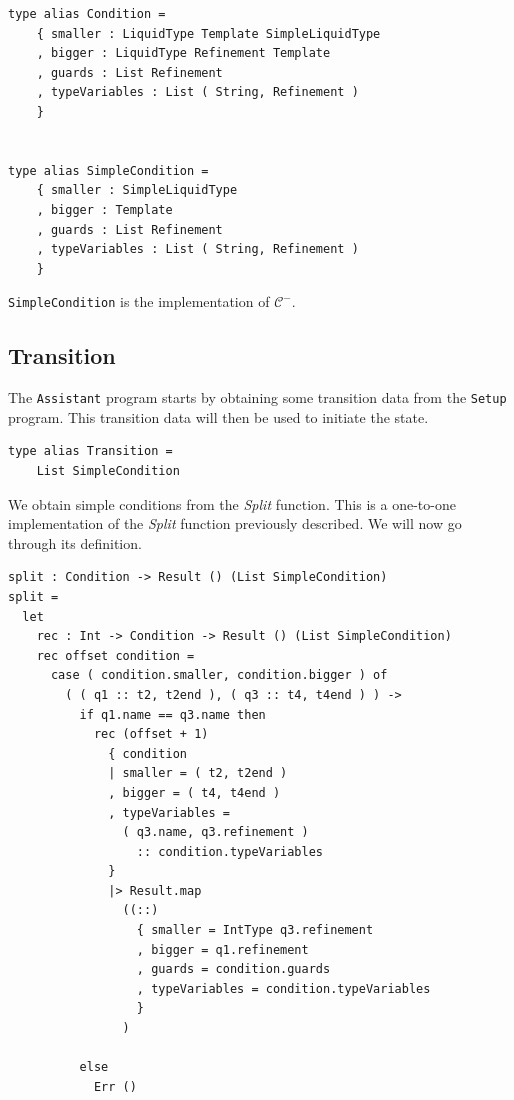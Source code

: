 \documentclass[]{scrbook}
\theoremstyle{definition}
\theoremstyle{definition}
\theoremstyle{definition}
\theoremstyle{remark}
\begin{document}
\begin{verbatim}
type alias Condition =
    { smaller : LiquidType Template SimpleLiquidType
    , bigger : LiquidType Refinement Template
    , guards : List Refinement
    , typeVariables : List ( String, Refinement )
    }


type alias SimpleCondition =
    { smaller : SimpleLiquidType
    , bigger : Template
    , guards : List Refinement
    , typeVariables : List ( String, Refinement )
    }
\end{verbatim}

\texttt{SimpleCondition} is the implementation of \(\mathcal{C}^-\).

\subsection{Transition}\label{transition}

The \texttt{Assistant} program starts by obtaining some transition data
from the \texttt{Setup} program. This transition data will then be used
to initiate the state.

\begin{verbatim}
type alias Transition =
    List SimpleCondition
\end{verbatim}

We obtain simple conditions from the \emph{Split} function. This is a
one-to-one implementation of the \emph{Split} function previously
described. We will now go through its definition.

\text{\textemdash}

\begin{verbatim}
split : Condition -> Result () (List SimpleCondition)
split =
  let
    rec : Int -> Condition -> Result () (List SimpleCondition)
    rec offset condition =
      case ( condition.smaller, condition.bigger ) of
        ( ( q1 :: t2, t2end ), ( q3 :: t4, t4end ) ) ->
          if q1.name == q3.name then
            rec (offset + 1)
              { condition
              | smaller = ( t2, t2end )
              , bigger = ( t4, t4end )
              , typeVariables =
                ( q3.name, q3.refinement )
                  :: condition.typeVariables
              }
              |> Result.map
                ((::)
                  { smaller = IntType q3.refinement
                  , bigger = q1.refinement
                  , guards = condition.guards
                  , typeVariables = condition.typeVariables
                  }
                )

          else
            Err ()
\end{verbatim}
\end{document}
